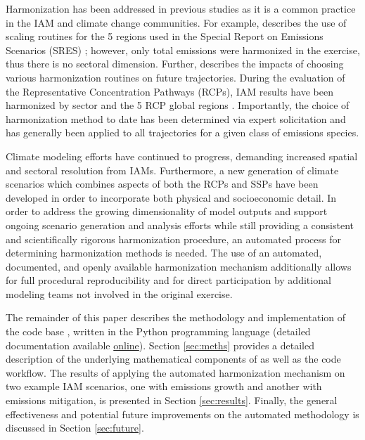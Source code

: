 Harmonization has been addressed in previous studies as it is a common practice
in the IAM and climate change communities. For example,
\cite{meinshausen_rcp_2011} describes the use of scaling routines for the 5
regions used in the Special Report on Emissions Scenarios (SRES)
\cite{nakicenovic2000}; however, only total emissions were harmonized in the
exercise, thus there is no sectoral dimension. Further,
\cite{rogelj_discrepancies_2011} describes the impacts of choosing various
harmonization routines on future trajectories. During the evaluation of the
Representative Concentration Pathways (RCPs), IAM results have been harmonized
by sector and the 5 RCP global regions
\cite{vuuren_representative_2011}. Importantly, the choice of harmonization
method to date has been determined via expert solicitation and has generally
been applied to all trajectories for a given class of emissions species.

Climate modeling efforts have continued to progress, demanding increased spatial
and sectoral resolution from IAMs. Furthermore, a new generation of climate
scenarios which combines aspects of both the RCPs and SSPs have been developed
in order to incorporate both physical and socioeconomic detail. In order to
address the growing dimensionality of model outputs and support ongoing scenario
generation and analysis efforts while still providing a consistent and
scientifically rigorous harmonization procedure, an automated process for
determining harmonization methods is needed. The use of an automated,
documented, and openly available harmonization mechanism additionally allows for
full procedural reproducibility and for direct participation by additional
modeling teams not involved in the original exercise.

The remainder of this paper describes the methodology and implementation of the
 code base \cite{matthew_gidden_2017_802832}, written in the Python
programming language (detailed documentation available
\href{http://mattgidden.com/aneris/}{online}). Section \ref{sec:meths} provides
a detailed description of the underlying mathematical components of
 as well as the code workflow. The results of applying the
automated harmonization mechanism on two example IAM scenarios, one with
emissions growth and another with emissions mitigation, is presented in Section
\ref{sec:results}. Finally, the general effectiveness and potential future
improvements on the automated methodology is discussed in Section
\ref{sec:future}.

